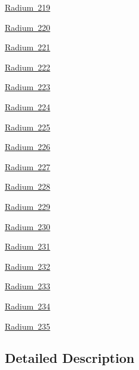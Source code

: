 \begin{DoxyCompactItemize}
\item 
\mbox{\hyperlink{group___isotope_const-_radium-_ra219}{Radium 219}}
\item 
\mbox{\hyperlink{group___isotope_const-_radium-_ra220}{Radium 220}}
\item 
\mbox{\hyperlink{group___isotope_const-_radium-_ra221}{Radium 221}}
\item 
\mbox{\hyperlink{group___isotope_const-_radium-_ra222}{Radium 222}}
\item 
\mbox{\hyperlink{group___isotope_const-_radium-_ra223}{Radium 223}}
\item 
\mbox{\hyperlink{group___isotope_const-_radium-_ra224}{Radium 224}}
\item 
\mbox{\hyperlink{group___isotope_const-_radium-_ra225}{Radium 225}}
\item 
\mbox{\hyperlink{group___isotope_const-_radium-_ra226}{Radium 226}}
\item 
\mbox{\hyperlink{group___isotope_const-_radium-_ra227}{Radium 227}}
\item 
\mbox{\hyperlink{group___isotope_const-_radium-_ra228}{Radium 228}}
\item 
\mbox{\hyperlink{group___isotope_const-_radium-_ra229}{Radium 229}}
\item 
\mbox{\hyperlink{group___isotope_const-_radium-_ra230}{Radium 230}}
\item 
\mbox{\hyperlink{group___isotope_const-_radium-_ra231}{Radium 231}}
\item 
\mbox{\hyperlink{group___isotope_const-_radium-_ra232}{Radium 232}}
\item 
\mbox{\hyperlink{group___isotope_const-_radium-_ra233}{Radium 233}}
\item 
\mbox{\hyperlink{group___isotope_const-_radium-_ra234}{Radium 234}}
\item 
\mbox{\hyperlink{group___isotope_const-_radium-_ra235}{Radium 235}}
\end{DoxyCompactItemize}


\subsection{Detailed Description}
